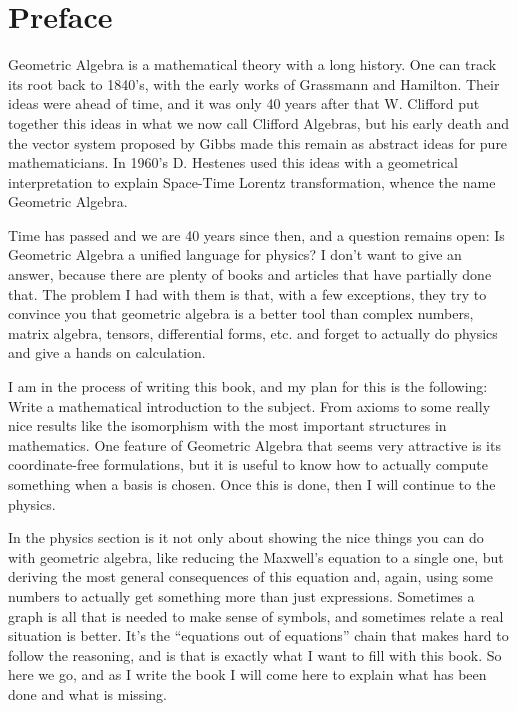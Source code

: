 \chapter{Preface}

Geometric Algebra is a mathematical theory with a long history. One can track its root back to 1840's, with the early works of Grassmann and Hamilton. Their ideas were ahead of time, and it was only 40 years after that W. Clifford put together this ideas in what we now call Clifford Algebras, but his early death and the vector system proposed by Gibbs made this remain as abstract ideas for pure mathematicians. In 1960's D. Hestenes used this ideas with a geometrical interpretation to explain Space-Time Lorentz transformation, whence the name Geometric Algebra. 

\hfill \newline

Time has passed and we are 40 years since then, and a question remains open: Is Geometric Algebra a unified language for physics? I don't want to give an answer, because there are plenty of books and articles that have partially done that. The problem I had with them is that, with a few exceptions, they try to convince you that geometric algebra is a better tool than complex numbers, matrix algebra, tensors, differential forms, etc. and forget to actually do physics and give a hands on calculation.

\hfill \newline


I am in the process of writing this book, and my plan for this is the following: Write a mathematical introduction to the subject. From axioms to some really nice results like the isomorphism with the most important structures in mathematics. One feature of Geometric Algebra that seems very attractive is its coordinate-free formulations, but it is useful to know how to actually compute something when a basis is chosen.  Once this is done, then I will continue to the physics.

\hfill \newline

In the physics section is it not only about showing the nice things you can do with geometric algebra, like reducing the Maxwell's equation to a single one, but deriving the most general consequences of this equation and, again, using some numbers to actually get something more than just expressions. Sometimes a graph is all that is needed to make sense of symbols, and sometimes relate a real situation is better. It's the ``equations out of equations'' chain that makes hard to follow the reasoning, and is that is exactly what I want to fill with this book. So here we go, and as I write the book I will come here to explain what has been done and what is missing.